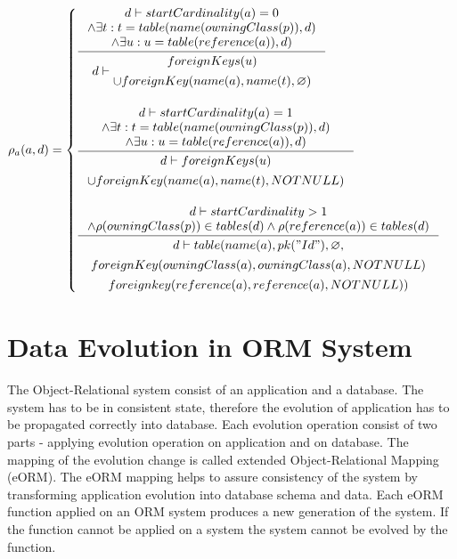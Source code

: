 \documentclass[11pt]{article}
\begin{document}
$
\rho_a(a,d) = \begin{cases}
 \inference{d \vdash startCardinality(a) = 0 \\ \wedge \exists t : t = table(name(owningClass(p)), d) \\ \wedge \exists u : u = table(reference(a)), d)}{d \vdash 
 \begin{gathered}
 foreignKeys(u) \\ \cup foreignKey(name(a), name(t),  \varnothing) 
 \end{gathered}
 }
  \\ \\
 \inference{d \vdash startCardinality(a) = 1 \\\\ \wedge \exists t : t = table(name(owningClass(p)), d) \\ \wedge \exists u : u = table(reference(a)), d)}{\begin{gathered} d \vdash 
foreignKeys(u) \\ \cup  foreignKey(name(a), name(t),  NOTNULL)
\end{gathered}
} \\ \\
 
  \inference{d \vdash  startCardinality > 1 \\ \wedge \rho(owningClass(p)) \in tables(d) \wedge \rho(reference(a)) \in tables(d)}{
  \begin{gathered} d \vdash 
 table(name(a), pk("Id"), \varnothing, \\ foreignKey(owningClass(a),owningClass(a), NOTNULL) \\ foreignkey(reference(a), reference(a), NOTNULL)) 
  \end{gathered}}

  
 \end{cases}
$


\section{Data Evolution in ORM System}
The Object-Relational system consist of an application and a database. The system has to be in consistent state, therefore the evolution of application has to be propagated correctly into database. Each evolution operation consist of two parts - applying evolution operation on application and on database. The mapping of the evolution change is called extended Object-Relational Mapping (eORM). The eORM mapping helps to assure consistency of the system by transforming application evolution into database schema and data. Each eORM function applied on an ORM system produces a new generation of the system. If the function cannot be applied on a system the system cannot be evolved by the function. 
\end{document}
